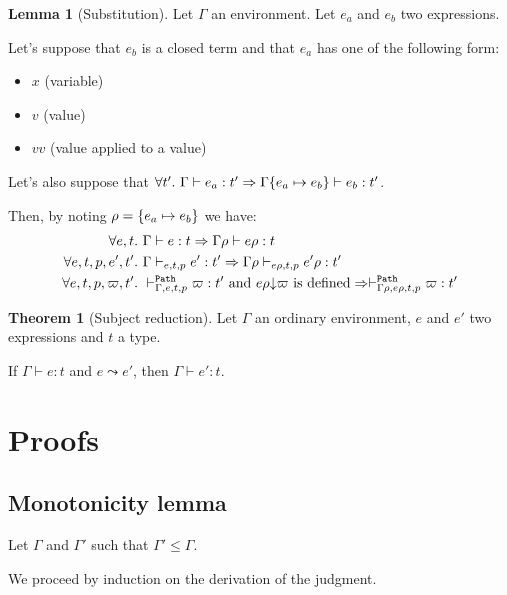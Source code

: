 \documentclass[a4paper]{article}
\theoremstyle{definition}
\newtheorem{theorem}{Theorem}
\newtheorem{lemma}{Lemma}
\begin{document}
        \begin{lemma}[Substitution]
          Let $\Gamma$ an environment. Let $e_a$ and $e_b$ two expressions.

          Let's suppose that $e_b$ is a closed term and that $e_a$ has one of the following form:
          \begin{itemize}
            \item $x$ (variable)
            \item $v$ (value)
            \item $v v$ (value applied to a value)
          \end{itemize}
          Let's also suppose that $\forall t'.\ \Gamma \vdash e_a : t' \Rightarrow \Gamma\subst {e_a} {e_b} \vdash e_b:t'$.
          
          Then, by noting $\rho = \subst {e_a} {e_b}$ we have:
          \begin{align*}
            \forall e,t.\ &\Gamma \vdash e:t \Rightarrow \Gamma\rho \vdash e\rho:t\\
            \forall e,t,p,e',t'.\ &\Gamma \cvdash p {e} {t} e':t' \Rightarrow \Gamma\rho \cvdash p {e\rho} {t} e'\rho:t'\\
            \forall e,t,p,\varpi,t'.\ &\pvdash \Gamma p e t \varpi:t' \text{ and }\occ {e\rho} \varpi\text{ is defined} \Rightarrow \pvdash {\Gamma\rho} p {e\rho} t \varpi:t'
          \end{align*}
        \end{lemma}

        \begin{theorem}[Subject reduction]
          Let $\Gamma$ an ordinary environment, $e$ and $e'$ two expressions and $t$ a type.

          If $\Gamma\vdash e:t$ and $e\leadsto e'$, then $\Gamma\vdash e':t$.
        \end{theorem}

        \section{Proofs}

        \subsection{Monotonicity lemma}

        Let $\Gamma$ and $\Gamma'$ such that $\Gamma' \leq \Gamma$.

        We proceed by induction on the derivation of the judgment.
\end{document}

